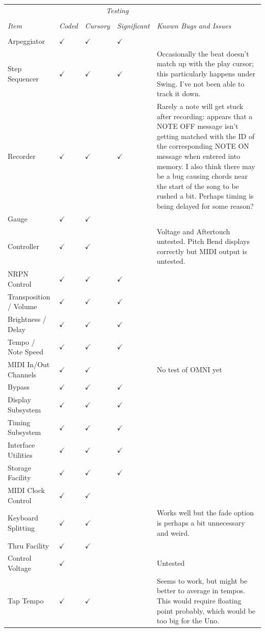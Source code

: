 \documentclass{article}
\begin{document}
\begin{center}
{
\setlength\extrarowheight{0.3em}
\begin{tabular}{@{}llllp{2.8in}@{}}
&&\multicolumn{2}{c}{\it Testing}&\\[0.1em]
\cline{3-4}\\[-0.9em]
{\it Item} & {\it Coded} & {\it Cursory} & {\it Significant} & {\it Known Bugs and Issues}\\[0.1em]
		\hline\\[-1.5em]
Arpeggiator& $\checkmark$ & $\checkmark$ & $\checkmark$  & \\
Step Sequencer& $\checkmark$ & $\checkmark$ & $\checkmark$ & Occasionally the beat doesn't match up with the play cursor; this particularly happens under Swing.  I've not been able to track it down.\\
Recorder& $\checkmark$ & $\checkmark$ & $\checkmark$ & Rarely a note will get stuck after recording: appears that a NOTE OFF message isn't getting matched with the ID of the corresponding NOTE ON message when entered into memory.  
I also think there may be a bug causing chords near the start of the song to be rushed a bit.  Perhaps timing is being delayed for some reason?\\
Gauge& $\checkmark$ & $\checkmark$ &\\ 
Controller& $\checkmark$ & $\checkmark$ & & Voltage and Aftertouch untested.  Pitch Bend displays correctly but MIDI output is untested.\\ 
NRPN Control  &  $\checkmark$ & $\checkmark$ &  $\checkmark$ &\\
Transposition / Volume  &  $\checkmark$ & $\checkmark$ &  $\checkmark$ &\\
Brightness / Delay  &  $\checkmark$ & $\checkmark$ &  $\checkmark$ &\\
Tempo / Note Speed &  $\checkmark$ & $\checkmark$ &  $\checkmark$ &\\
MIDI In/Out Channels &  $\checkmark$ & $\checkmark$ &  & No test of OMNI yet\\
Bypass &  $\checkmark$ & $\checkmark$ &  $\checkmark$ &\\
Display Subsystem  &  $\checkmark$ & $\checkmark$ &  $\checkmark$ &\\
Timing  Subsystem &  $\checkmark$ & $\checkmark$ &  $\checkmark$ &\\
Interface Utilities &  $\checkmark$ & $\checkmark$ &  $\checkmark$ & \\
Storage Facility &  $\checkmark$ & $\checkmark$ &  $\checkmark$ &\\
MIDI Clock Control& $\checkmark$ & $\checkmark$ & &\\
Keyboard Splitting& $\checkmark$ & $\checkmark$  & & Works well but the fade option is perhaps a bit unnecessary and weird.\\
Thru Facility & $\checkmark$ & $\checkmark$ & & \\
Control Voltage& $\checkmark$ & & & Untested\\
Tap Tempo & $\checkmark$ & $\checkmark$& & Seems to work, but might be better to average in tempos.  This would require floating point probably, which would be too big for the Uno.
\end{tabular}
}
\end{center}
\end{document}
